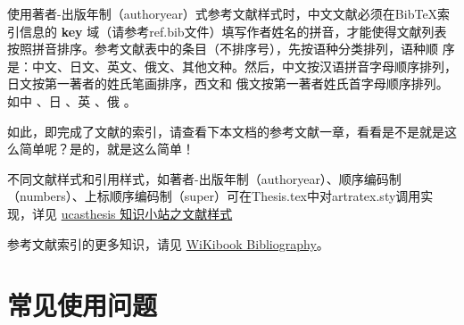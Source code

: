 使用著者-出版年制（authoryear）式参考文献样式时，中文文献必须在BibTeX索引信息的 \textbf{key} 域（请参考ref.bib文件）填写作者姓名的拼音，才能使得文献列表按照拼音排序。参考文献表中的条目（不排序号），先按语种分类排列，语种顺 序是：中文、日文、英文、俄文、其他文种。然后，中文按汉语拼音字母顺序排列，日文按第一著者的姓氏笔画排序，西文和 俄文按第一著者姓氏首字母顺序排列。如中 \citep{niu2013zonghe}、日 \citep{Bohan1928}、英 \citep{stamerjohanns2009mathml}、俄 \citep{Dubrovin1906}。

如此，即完成了文献的索引，请查看下本文档的参考文献一章，看看是不是就是这么简单呢？是的，就是这么简单！

不同文献样式和引用样式，如著者-出版年制（authoryear）、顺序编码制（numbers）、上标顺序编码制（super）可在Thesis.tex中对artratex.sty调用实现，详见 \href{https://github.com/mohuangrui/ucasthesis/wiki}{ucasthesis 知识小站之文献样式}


参考文献索引的更多知识，请见 \href{https://en.wikibooks.org/wiki/LaTeX/Bibliography_Management}{WiKibook Bibliography}。\nocite{*}%


\section{常见使用问题}\label{sec:qa}

